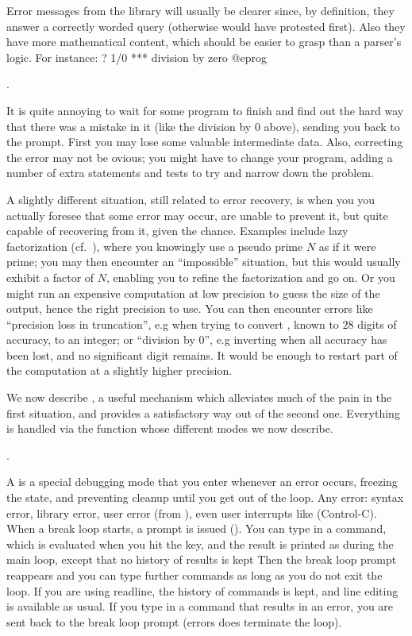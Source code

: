 Error messages from the library will usually be clearer since, by
definition, they answer a correctly worded query (otherwise  would have
protested first). Also they have more mathematical content, which should be
easier to grasp than a parser's logic. For instance:
\bprog
? 1/0
  ***   division by zero
@eprog

.\label{se:errorrec}

It is quite annoying to wait for some program to finish and find out the hard
way that there was a mistake in it (like the division by 0 above), sending
you back to the prompt. First you may lose some valuable intermediate data.
Also, correcting the error may not be ovious; you might have to change your
program, adding a number of extra statements and tests to try and narrow down
the problem.

A slightly different situation, still related to error recovery, is when you
you actually foresee that some error may occur, are unable to prevent it, but
quite capable of recovering from it, given the chance. Examples include lazy
factorization (cf.~), where you knowingly use a pseudo prime
$N$ as if it were prime; you may then encounter an ``impossible'' situation,
but this would usually exhibit a factor of $N$, enabling you to refine the
factorization and go on. Or you might run an expensive computation at low
precision to guess the size of the output, hence the right precision to use.
You can then encounter errors like ``precision loss in truncation'', e.g when
trying to convert , known to $28$ digits of accuracy, to an
integer; or ``division by 0'', e.g inverting  when all accuracy
has been lost, and no significant digit remains. It would be enough to
restart part of the computation at a slightly higher precision.

We now describe , a useful mechanism which alleviates
much of the pain in the first situation, and provides a satisfactory way out
of the second one. Everything is handled via the  function whose
different modes we now describe.

.\label{se:breakloop}

A  is a special debugging mode that you enter whenever an
error occurs, freezing the  state, and preventing cleanup until you get out
of the loop. Any error: syntax error, library error, user error (from
), even user interrupts like  (Control-C). When a break
loop starts, a prompt is issued (). You can type in a  command,
which is evaluated when you hit the  key, and the result is
printed as during the main  loop, except that no history of results is kept
Then the break loop prompt reappears and you can type further commands as
long as you do not exit the loop. If you are using readline, the history of
commands is kept, and line editing is available as usual. If you type in a
command that results in an error, you are sent back to the break loop prompt
(errors does  terminate the loop).

